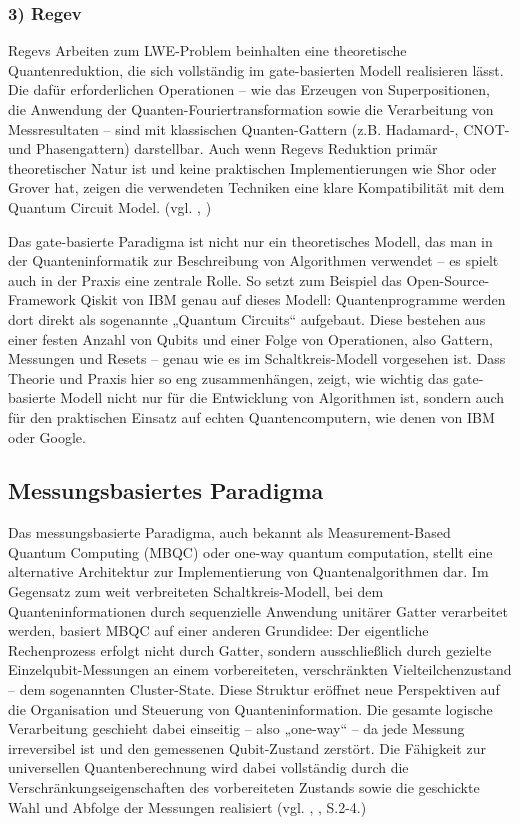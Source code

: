 \subsubsection*{3) Regev}
Regevs Arbeiten zum LWE-Problem beinhalten eine theoretische Quantenreduktion, die sich vollständig im gate-basierten Modell realisieren lässt. Die dafür erforderlichen Operationen – wie das Erzeugen von Superpositionen, die Anwendung der Quanten-Fouriertransformation sowie die Verarbeitung von Messresultaten – sind mit klassischen Quanten-Gattern (z.B. Hadamard-, CNOT- und Phasengattern) darstellbar. Auch wenn Regevs Reduktion primär theoretischer Natur ist und keine praktischen Implementierungen wie Shor oder Grover hat, zeigen die verwendeten Techniken eine klare Kompatibilität mit dem Quantum Circuit Model.
(vgl. \citeauthor{regev_lattices_2024}, \citeyear{regev_lattices_2024})


Das gate-basierte Paradigma ist nicht nur ein theoretisches Modell, das man in der Quanteninformatik zur Beschreibung von Algorithmen verwendet – es spielt auch in der Praxis eine zentrale Rolle. So setzt zum Beispiel das Open-Source-Framework Qiskit von IBM genau auf dieses Modell: Quantenprogramme werden dort direkt als sogenannte „Quantum Circuits“ aufgebaut. Diese bestehen aus einer festen Anzahl von Qubits und einer Folge von Operationen, also Gattern, Messungen und Resets – genau wie es im Schaltkreis-Modell vorgesehen ist.
Dass Theorie und Praxis hier so eng zusammenhängen, zeigt, wie wichtig das gate-basierte Modell nicht nur für die Entwicklung von Algorithmen ist, sondern auch für den praktischen Einsatz auf echten Quantencomputern, wie denen von IBM oder Google.

\subsection{Messungsbasiertes Paradigma}
Das messungsbasierte Paradigma, auch bekannt als Measurement-Based Quantum Computing (MBQC) oder one-way quantum computation, stellt eine alternative Architektur zur Implementierung von Quantenalgorithmen dar. Im Gegensatz zum weit verbreiteten Schaltkreis-Modell, bei dem Quanteninformationen durch sequenzielle Anwendung unitärer Gatter verarbeitet werden, basiert MBQC auf einer anderen Grundidee: Der eigentliche Rechenprozess erfolgt nicht durch Gatter, sondern ausschließlich durch gezielte Einzelqubit-Messungen an einem vorbereiteten, verschränkten Vielteilchenzustand – dem sogenannten Cluster-State.
Diese Struktur eröffnet neue Perspektiven auf die Organisation und Steuerung von Quanteninformation. Die gesamte logische Verarbeitung geschieht dabei einseitig – also „one-way“ – da jede Messung irreversibel ist und den gemessenen Qubit-Zustand zerstört. Die Fähigkeit zur universellen Quantenberechnung wird dabei vollständig durch die Verschränkungseigenschaften des vorbereiteten Zustands sowie die geschickte Wahl und Abfolge der Messungen realisiert (vgl. \citeauthor{h_j_briegel_measurement-based_2009}, \citeyear{h_j_briegel_measurement-based_2009}, S.2-4.)
